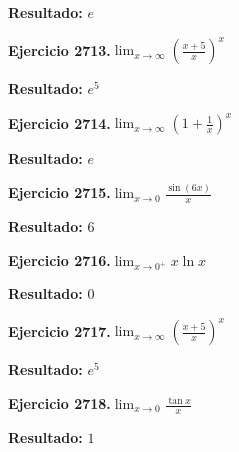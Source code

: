 \documentclass[10pt,a4paper]{article}
\begin{document}
\begin{solbox}
\textbf{Resultado:} \(\displaystyle e\)
\end{solbox}

\begin{ejbox}
\textbf{Ejercicio 2713.}\quad $\lim_{x\to \infty} \left(\frac{x+5}{x}\right)^{x}$
\end{ejbox}

\begin{solbox}
\textbf{Resultado:} \(\displaystyle e^{5}\)
\end{solbox}

\begin{ejbox}
\textbf{Ejercicio 2714.}\quad $\lim_{x\to \infty} \left(1+\frac{1}{x}\right)^x$
\end{ejbox}

\begin{solbox}
\textbf{Resultado:} \(\displaystyle e\)
\end{solbox}

\newpage
\begin{ejbox}
\textbf{Ejercicio 2715.}\quad $\lim_{x\to 0} \frac{\sin(6x)}{x}$
\end{ejbox}

\begin{solbox}
\textbf{Resultado:} \(\displaystyle 6\)
\end{solbox}

\begin{ejbox}
\textbf{Ejercicio 2716.}\quad $\lim_{x\to 0^+} x\ln x$
\end{ejbox}

\begin{solbox}
\textbf{Resultado:} \(\displaystyle 0\)
\end{solbox}

\begin{ejbox}
\textbf{Ejercicio 2717.}\quad $\lim_{x\to \infty} \left(\frac{x+5}{x}\right)^{x}$
\end{ejbox}

\begin{solbox}
\textbf{Resultado:} \(\displaystyle e^{5}\)
\end{solbox}

\newpage
\begin{ejbox}
\textbf{Ejercicio 2718.}\quad $\lim_{x\to 0} \frac{\tan x}{x}$
\end{ejbox}

\begin{solbox}
\textbf{Resultado:} \(\displaystyle 1\)
\end{solbox}
\end{document}
